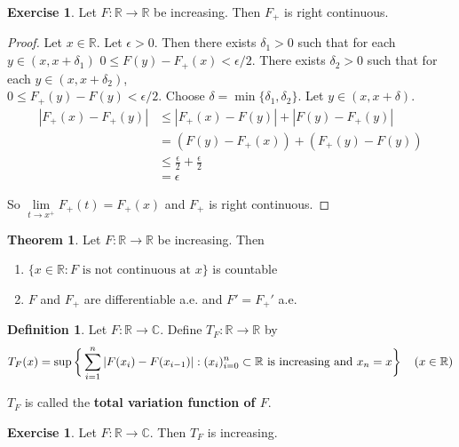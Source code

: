 \documentclass[12pt]{amsart}
\theoremstyle{definition}
\newtheorem{defn}[definition]{Definition}
\newtheorem{thm}[definition]{Theorem}
\newtheorem{ex}[definition]{Exercise}
\newcommand{\del}{\delta}
\newcommand{\ep}{\epsilon}
\newcommand{\C}{\mathbb{C}}
\newcommand{\R}{\mathbb{R}}
\begin{document}
	\begin{ex}
		Let $F:\R \rightarrow \R$ be increasing. Then $F_+$ is right continuous. 
	\end{ex}
	
	\begin{proof}
		Let $x \in \R$. Let $\ep >0$. Then there exists $\del_1>0$ such that for each $y \in (x,x+\del_1)$ $0 \leq F(y)-F_+(x) < \ep/2$. There exists $\del_2 >0$ such that for each $y \in (x,x+\del_2)$, \\$0 \leq F_+(y)-F(y) < \ep/2$. Choose $\del = \min\{\del_1, \del_2\}$. Let $y \in (x, x+\del)$.
		\begin{align*}
			|F_+(x) - F_+(y)|
			& \leq |F_+(x) - F(y)| + |F(y)- F_+(y)| \\
			& = (F(y) - F_+(x)) + (F_+(y) - F(y)) \\
			& \leq \frac{\ep}{2} + \frac{\ep}{2}\\
			& = \ep
		\end{align*}
		
		So $\lim\limits_{t \rightarrow x^+} F_+(t) = F_+(x)$ and $F_+$ is right continuous.
	\end{proof}
	
	\begin{thm}
		Let $F:\R \rightarrow \R$ be increasing. Then 
		\begin{enumerate}
			\item $\{x \in \R: F \text{ is not continuous at }x\}$ is countable
			\item $F$ and $F_+$ are differentiable a.e. and $F' = F_+'$ a.e.
		\end{enumerate}
	\end{thm}
	
	\begin{defn}
		Let $F:\R \rightarrow \C$. Define $T_F:\R \rightarrow \R$ by $$T_F(x) = \sup\bigg \{\sum_{i=1}^{n}|F(x_{i}) - F(x_{i-1})|: (x_i)_{i=0}^n \subset \R \text{ is increasing and } x_n=x  \bigg \} \hspace{4mm} (x \in \R)$$
		
		$T_F$ is called the \textbf{total variation function of $F$}.
	\end{defn}
	
	\begin{ex}
		Let $F:\R \rightarrow \C$. Then $T_F$ is increasing.
	\end{ex}
	
\end{document}
